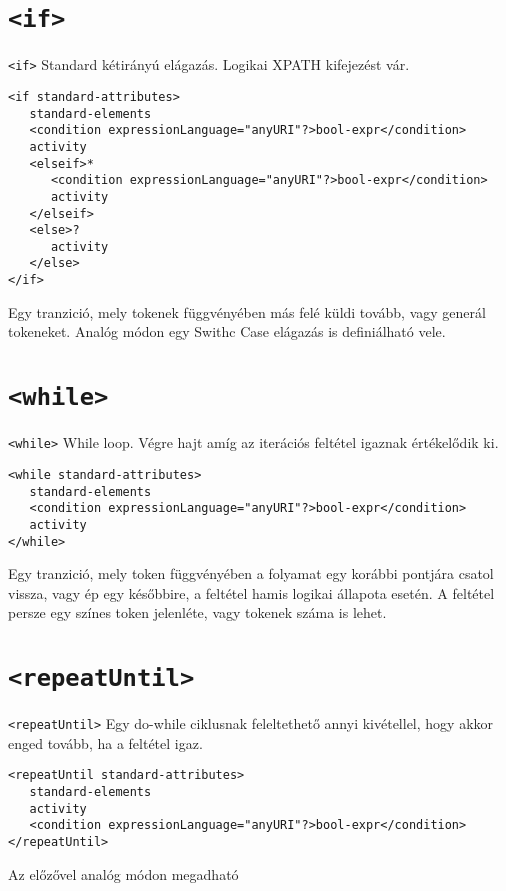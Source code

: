 \section{\texttt{<if>}}
\texttt{<if>} Standard kétirányú elágazás. Logikai XPATH kifejezést vár. 
\begin{verbatim}
<if standard-attributes>
   standard-elements
   <condition expressionLanguage="anyURI"?>bool-expr</condition>
   activity
   <elseif>*
      <condition expressionLanguage="anyURI"?>bool-expr</condition>
      activity
   </elseif>
   <else>?
      activity
   </else>
</if>
\end{verbatim}
Egy tranzició, mely tokenek függvényében más felé küldi tovább, vagy generál tokeneket. Analóg módon egy Swithc Case elágazás is definiálható vele.

\section{\texttt{<while>}}
\texttt{<while>} While loop. Végre hajt amíg az iterációs feltétel igaznak értékelődik ki. 
\begin{verbatim}
<while standard-attributes>
   standard-elements
   <condition expressionLanguage="anyURI"?>bool-expr</condition>
   activity
</while>
\end{verbatim}
Egy tranzició, mely token függvényében a folyamat egy korábbi pontjára csatol vissza, vagy ép egy későbbire, a feltétel hamis logikai állapota esetén. A feltétel persze egy színes token jelenléte, vagy tokenek száma is lehet. 

\section{\texttt{<repeatUntil>}}
\texttt{<repeatUntil>} Egy do-while ciklusnak feleltethető annyi kivétellel, hogy akkor enged tovább, ha a feltétel igaz. 
\begin{verbatim}
<repeatUntil standard-attributes>
   standard-elements
   activity
   <condition expressionLanguage="anyURI"?>bool-expr</condition>
</repeatUntil>
\end{verbatim}
Az előzővel analóg módon megadható

